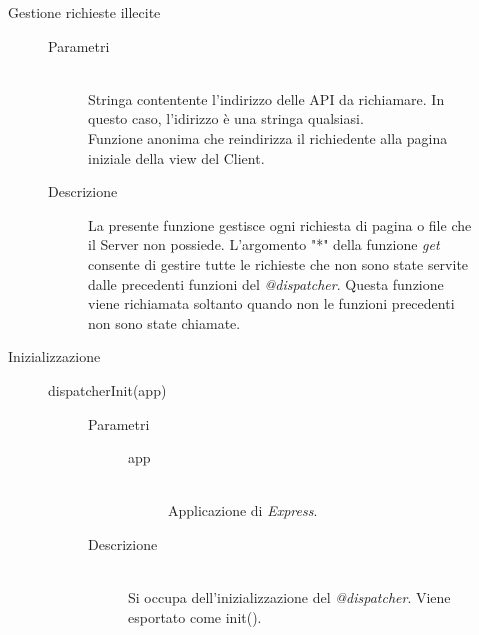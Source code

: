 \begin{description}
\begin{description}
\begin{mldescription}
 \end{mldescription}

\item[Gestione richieste illecite]
 \begin{mldescription}
 \begin{description}
  \item[Parametri]
   \begin{mldescription}
     \hfill \\
    Stringa contentente l'indirizzo delle API da richiamare. In questo caso, l'idirizzo è una stringa qualsiasi.
     \hfill \\
    Funzione anonima che reindirizza il richiedente alla pagina iniziale della view del Client.
   \end{mldescription}
  \item[Descrizione]
 La presente funzione gestisce ogni richiesta di pagina o file che il Server non possiede. L'argomento "*" della funzione \textit{get} consente di gestire tutte le richieste che non sono state servite dalle precedenti funzioni del \textit{@dispatcher}. Questa funzione viene richiamata soltanto quando non le funzioni precedenti non sono state chiamate.
 \end{description} 
 \end{mldescription}

\item[Inizializzazione] \hfill
 \begin{description}
  \item[dispatcherInit(app)] \hfill 
  \begin{description}
   \item[Parametri] \hfill 
    \begin{description}
     \item[app] \hfill \\
     Applicazione di \textit{Express}.
    \end{description}
   \item[Descrizione] \hfill \\
   Si occupa dell'inizializzazione del \textit{@dispatcher}. Viene esportato come init().
  \end{description}
 \end{description}
\end{description}
\end{description}



